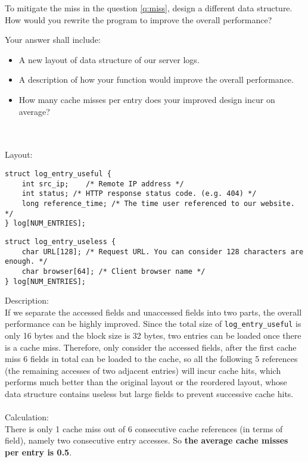 \begin{questions}
\question[6] To mitigate the miss in the question \ref{q:miss},
design a different data structure. How would you rewrite the
program to improve the overall performance?

Your answer shall include:

\begin{itemize}
    \item A new layout of data structure of our server logs.
    \item A description of how your function would improve the
    overall performance.
    \item How many cache misses per entry does your improved
    design incur on average?
\end{itemize}

{
    \begin{solution}
        \\
        \\
        Layout:
        \begin{verbatim}
struct log_entry_useful {
    int src_ip;    /* Remote IP address */
    int status; /* HTTP response status code. (e.g. 404) */
    long reference_time; /* The time user referenced to our website. */
} log[NUM_ENTRIES];
        \end{verbatim}
        \begin{verbatim}
struct log_entry_useless {
    char URL[128]; /* Request URL. You can consider 128 characters are enough. */
    char browser[64]; /* Client browser name */
} log[NUM_ENTRIES];
        \end{verbatim}

        Description:\\
        If we separate the accessed fields and unaccessed fields into two parts, the overall performance can be highly improved. Since the total size of \texttt{log\_entry\_useful} is only 16 bytes and the block size is 32 bytes, two entries can be loaded once there is a cache miss. Therefore, only consider the accessed fields, after the first cache miss 6 fields in total can be loaded to the cache, so all the following 5 references (the remaining accesses of two adjacent entries) will incur cache hits, which performs much better than the original layout or the reordered layout, whose data structure contains useless but large fields to prevent successive cache hits.\\
        \\
        Calculation:\\
        There is only 1 cache miss out of 6 consecutive cache references (in terms of field), namely two consecutive entry accesses. So \textbf{the average cache misses per entry is 0.5}.

    \end{solution}
}

\end{questions}